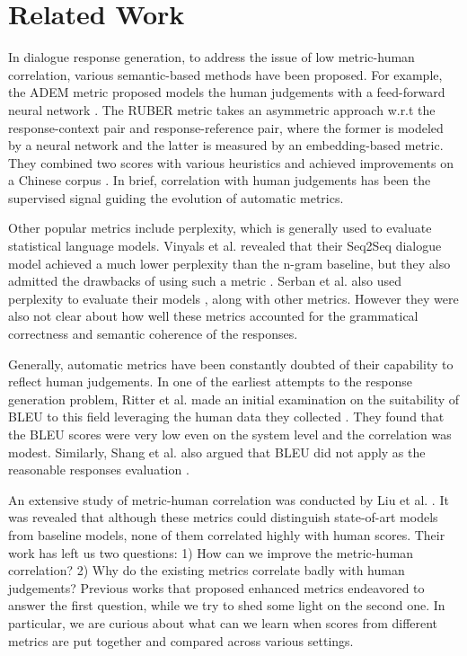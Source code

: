 \documentclass[conference]{IEEEtran}
\begin{document}
\section{Related Work}
In dialogue response generation, to address the issue of low metric-human correlation, various semantic-based methods have been proposed.
For example, the ADEM metric proposed models the human judgements with a feed-forward neural network \cite{ADEM}.
The RUBER metric takes an asymmetric approach w.r.t the response-context pair and response-reference pair, where the former is modeled by a neural network and the latter is measured by an embedding-based metric.
They combined two scores with various heuristics and achieved improvements on a Chinese corpus \cite{RUBER}.
In brief, correlation with human judgements has been the supervised signal guiding the evolution of automatic metrics.

Other popular metrics include perplexity, which is generally used to evaluate statistical language models.
Vinyals et al. revealed that their Seq2Seq dialogue model achieved a much lower perplexity than the n-gram baseline, but they also admitted the drawbacks of using such a metric \cite{GoogleChatbot}.
Serban et al. also used perplexity to evaluate their models \cite{HRED}, along with other metrics.
However they were also not clear about how well these metrics accounted for the grammatical correctness and semantic coherence of the responses.

Generally, automatic metrics have been constantly doubted of their capability to reflect human judgements.
In one of the earliest attempts to the response generation problem, Ritter et al. made an initial examination on the suitability of BLEU to this field leveraging the human data they collected \cite{Ritter11}.
They found that the BLEU scores were very low even on the system level and the correlation was modest.
Similarly, Shang et al. also argued that BLEU did not apply as the reasonable responses evaluation \cite{Shang}.

An extensive study of metric-human correlation was conducted by Liu et al. \cite{HowNot}.
It was revealed that although these metrics could distinguish state-of-art models from baseline models, none of them correlated highly with human scores.
Their work has left us two questions: 1) How can we improve the metric-human correlation? 2) Why do the existing metrics correlate badly with human judgements?
Previous works that proposed enhanced metrics endeavored to answer the first question, while we try to shed some light on the second one.
In particular, we are curious about what can we learn when scores from different metrics are put together and compared across various settings.
\end{document}
